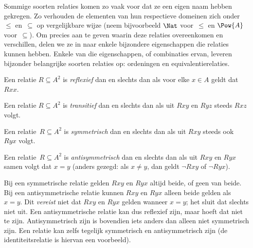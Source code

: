 \documentclass[../../../include/open-logic-section]{subfiles}
\begin{document}

\begin{intro}
Sommige soorten relaties komen zo vaak voor dat ze een eigen naam
hebben gekregen. Zo verhouden de elementen van hun respectieve
domeinen zich onder $\le$ en~$\subseteq$ op vergelijkbare wijze (neem
bijvoorbeeld $\Nat$ voor~$\le$ en $\Pow{A}$ voor~$\subseteq$). Om
precies aan te geven waarin deze relaties overeenkomen en verschillen,
delen we ze in naar enkele bijzondere eigenschappen die relaties
kunnen hebben. Enkele van die eigenschappen, of combinaties ervan,
leveren bijzonder belangrijke soorten relaties op: ordeningen en
equivalentierelaties.
\end{intro}

\begin{defn}[Reflexiviteit]
Een relatie $R \subseteq A^2$ is \emph{reflexief} dan en slechts dan
als voor elke $x \in A$ geldt dat $Rxx$.
\end{defn}

\begin{defn}[Transitiviteit]
Een relatie $R \subseteq A^2$ is \emph{transitief} dan en slechts dan
als uit $Rxy$ en $Ryz$ steeds $Rxz$ volgt.
\end{defn}

\begin{defn}[Symmetrie]
Een relatie~$R \subseteq A^2$ is \emph{symmetrisch} dan en slechts dan
als uit $Rxy$ steeds ook~$Ryx$ volgt.
\end{defn}

\begin{defn}[Antisymmetrie]
Een relatie~$R \subseteq A^2$ is \emph{an\-ti\-symmetrisch} dan en
slechts dan als uit $Rxy$ en $Ryx$ samen volgt dat $x=y$ (anders
gezegd: als $x\neq y$, dan geldt $\lnot Rxy$ of $\lnot Ryx$).
\end{defn}

\begin{explain}
Bij een symmetrische relatie gelden $Rxy$ en $Ryx$ altijd beide, of
geen van beide. Bij een antisymmetrische relatie kunnen $Rxy$ en $Ryx$
alleen beide gelden als $x = y$. Dit \emph{vereist} niet dat $Rxy$ en $Ryx$ gelden
wanneer $x = y$; het sluit dat slechts niet uit. Een
antisymmetrische relatie kan dus reflexief zijn, maar hoeft dat niet te
zijn. Antisymmetrisch zijn is bovendien iets anders dan alleen niet
symmetrisch zijn. Een relatie kan zelfs tegelijk symmetrisch en
antisymmetrisch zijn (de identiteitsrelatie is hiervan een voorbeeld).
\end{explain}
\end{document}
